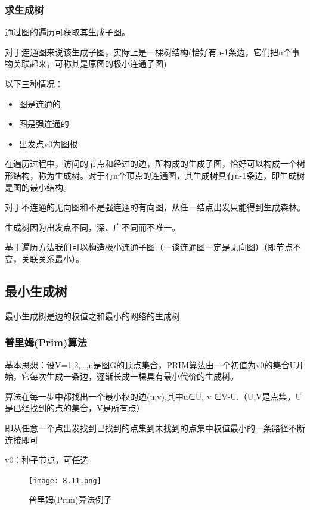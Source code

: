 \documentclass[AutoFakeBold]{LZUThesis2007}
\begin{document}
			\subsubsection{求生成树}
通过图的遍历可获取其生成子图。

对于连通图来说该生成子图，实际上是一棵树结构(恰好有n-1条边，它们把n个事物关联起来，可称其是原图的极小连通子图)

以下三种情况：
\begin{itemize}
	\item 图是连通的
	\item 图是强连通的
	\item 出发点v0为图根
\end{itemize}
在遍历过程中，访问的节点和经过的边，所构成的生成子图，恰好可以构成一个树形结构，称为生成树。对于有n个顶点的连通图，其生成树具有n-1条边，即生成树是图的最小结构。

对于不连通的无向图和不是强连通的有向图，从任一结点出发只能得到生成森林。

生成树因为出发点不同，深、广不同而不唯一。

基于遍历方法我们可以构造极小连通子图（一谈连通图一定是无向图）（即节点不变，关联关系最小）。

			\subsection{最小生成树}
最小生成树是边的权值之和最小的网络的生成树
				\subsubsection{普里姆(Prim)算法}
				基本思想：设V={1,2,…,n}是图G的顶点集合，PRIM算法由一个初值为{v0}的集合U开始，它每次生成一条边，逐渐长成一棵具有最小代价的生成树。

算法在每一步中都找出一个最小权的边(u,v),其中u∈U, v ∈V-U.（U,V是点集，U是已经找到的点的集合，V是所有点）

即从任意一个点出发找到已找到的点集到未找到的点集中权值最小的一条路径不断连接即可

v0：种子节点，可任选
\begin{figure}[H]
    \centering
    \texttt{[image: 8.11.png]}
    \caption{普里姆(Prim)算法例子}
    \label{fig_install_texlive}
\end{figure}
\end{document}
